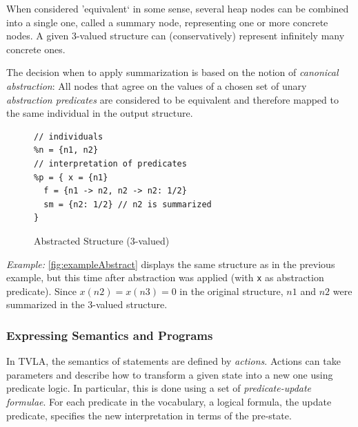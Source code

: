 \documentclass[11pt,a4paper,english]{article}
\begin{document}
When considered 'equivalent` in some sense, several heap nodes can be combined into a
single one, called a summary node, representing one or more concrete nodes. A
given 3-valued structure can (conservatively) represent infinitely many concrete
ones.

The decision when to apply summarization is based on the notion of
\textit{canonical abstraction}: All nodes that agree on the values of a chosen
set of unary \textit{abstraction predicates} are considered to be equivalent and
therefore mapped to the same individual in the output structure.

\begin{figure}[h]
\begin{lrbox}{\mylistingbox}
\begin{minipage}[b]{.45\linewidth}
\begin{lstlisting}[boxpos=b,language=tvs]
// individuals
%n = {n1, n2} 
// interpretation of predicates
%p = { x = {n1}
  f = {n1 -> n2, n2 -> n2: 1/2}
  sm = {n2: 1/2} // n2 is summarized
}
\end{lstlisting}
\end{minipage}
  \end{lrbox}
  \hspace{1cm}
  \caption{Abstracted Structure (3-valued)}
  \label{fig:exampleAbstract}
\end{figure}

\textit{Example: } \autoref{fig:exampleAbstract} displays the same structure as
in the previous example, but this time after abstraction was applied (with
\texttt{x} as abstraction predicate). Since $x(n2) = x(n3) = 0$ in the original
structure, $n1$ and $n2$ were summarized in the 3-valued structure.


\subsubsection{Expressing Semantics and Programs}
In TVLA, the semantics of statements are defined by \textit{actions}. Actions
can take parameters and describe how to transform a given state into a new one
using predicate logic. In particular, this is done using a set of \textit{predicate-update
formulae}. For each predicate in the vocabulary, a logical formula, the update
predicate, specifies the new interpretation in terms of the pre-state.
\end{document}
